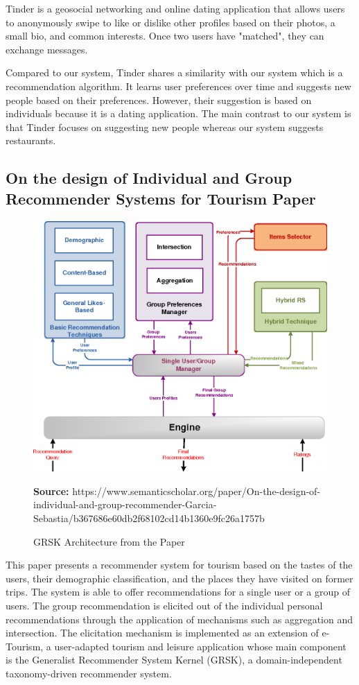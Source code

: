 \documentclass[12pt,oneside,openright,a4paper]{cpe-english-project}
\newcommand*{\captionsource}[2]{%
  \caption[{#1}]{#1}\vspace{-8pt}
  \textbf{Source:} #2}
\begin{document}
Tinder is a geosocial networking and online dating application that allows users to anonymously swipe to like or dislike other profiles based on their photos, a small bio, and common interests. Once two users have "matched", they can exchange messages. \cite{Tinderapp}

Compared to our system, Tinder shares a similarity with our system which is a recommendation algorithm. It learns user preferences over time and suggests new people based on their preferences. However, their suggestion is based on individuals because it is a dating application.  The main contrast to our system is that Tinder focuses on suggesting new people whereas our system suggests restaurants.

\newpage
\subsection{On the design of Individual and Group Recommender Systems for Tourism Paper}

\begin{figure}[H]\centering
\includegraphics[width=400pt]{./images/2grsk.png}
\label{fig:2grsk}
\captionsource{GRSK Architecture from the Paper}{https://www.semanticscholar.org/paper/On-the-design-of-individual-and-group-recommender-Garcia-Sebastia/b367686e60db2f68102cd14b1360e9fc26a1757b}
\end{figure}

This paper presents a recommender system for tourism based on the tastes of the users, their demographic classification, and the places they have visited on former trips. The system is able to offer recommendations for a single user or a group of users. The group recommendation is elicited out of the individual personal recommendations through the application of mechanisms such as aggregation and intersection. The elicitation mechanism is implemented as an extension of e-Tourism, a user-adapted tourism and leisure application whose main component is the Generalist Recommender System Kernel (GRSK), a domain-independent taxonomy-driven recommender system. \cite{ExpertSystemsWithApplications}
\end{document}
